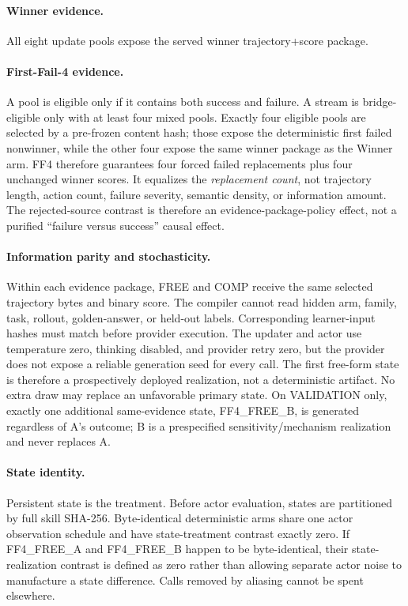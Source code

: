 \paragraph{Winner evidence.}
All eight update pools expose the served winner trajectory+score package.

\paragraph{First-Fail-4 evidence.}
A pool is eligible only if it contains both success and failure. A stream is bridge-eligible only with at least four mixed pools. Exactly four eligible pools are selected by a pre-frozen content hash; those expose the deterministic first failed nonwinner, while the other four expose the same winner package as the Winner arm. FF4 therefore guarantees four forced failed replacements plus four unchanged winner scores. It equalizes the \emph{replacement count}, not trajectory length, action count, failure severity, semantic density, or information amount. The rejected-source contrast is therefore an evidence-package-policy effect, not a purified ``failure versus success'' causal effect.

\paragraph{Information parity and stochasticity.}
Within each evidence package, FREE and COMP receive the same selected trajectory bytes and binary score. The compiler cannot read hidden arm, family, task, rollout, golden-answer, or held-out labels. Corresponding learner-input hashes must match before provider execution. The updater and actor use temperature zero, thinking disabled, and provider retry zero, but the provider does not expose a reliable generation seed for every call. The first free-form state is therefore a prospectively deployed realization, not a deterministic artifact. No extra draw may replace an unfavorable primary state. On VALIDATION only, exactly one additional same-evidence state, FF4\_FREE\_B, is generated regardless of A's outcome; B is a prespecified sensitivity/mechanism realization and never replaces A.

\paragraph{State identity.}
Persistent state is the treatment. Before actor evaluation, states are partitioned by full skill SHA-256. Byte-identical deterministic arms share one actor observation schedule and have state-treatment contrast exactly zero. If FF4\_FREE\_A and FF4\_FREE\_B happen to be byte-identical, their state-realization contrast is defined as zero rather than allowing separate actor noise to manufacture a state difference. Calls removed by aliasing cannot be spent elsewhere.


